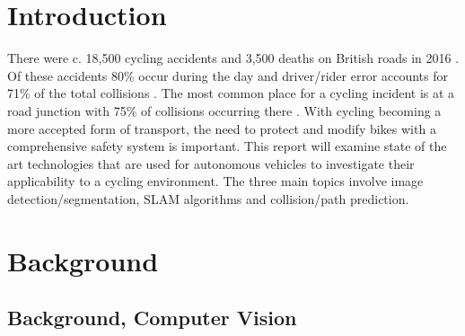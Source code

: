 \documentclass[11pt,twoside]{report}
\begin{document}

\chapter{Introduction}

There were c. 18,500 cycling accidents and 3,500 deaths on British roads in 2016 \cite{DFT_fig}. Of these accidents 80\% occur during the day and driver/rider error accounts for 71\% of the total collisions \cite{DFT_fig2}. The most common place for a cycling incident is at a road junction with 75\% of collisions occurring there \cite{DFT_fig3}. With cycling becoming a more accepted form of transport, the need to protect and modify bikes with a comprehensive safety system is important.
\newline\newline
This report will examine state of the art technologies that are used for autonomous vehicles to investigate their applicability to a cycling environment. The three main topics involve image detection/segmentation, SLAM algorithms and collision/path prediction. 

\newpage



\chapter{Background}
\section{Background, Computer Vision}\label{comp_vis_back}
\end{document}
